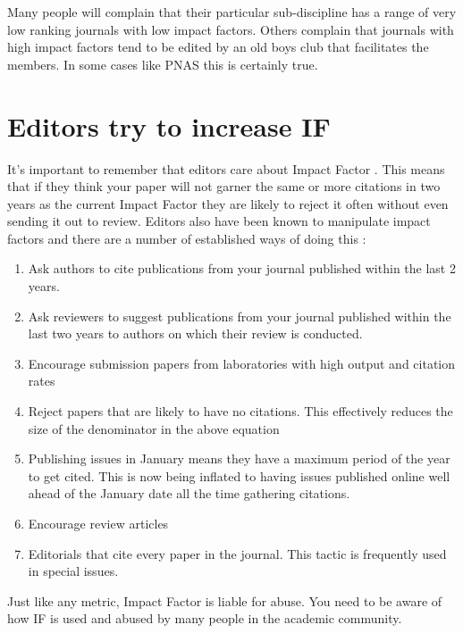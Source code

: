 \documentclass[
]{krantz}
\providecommand{\tightlist}{%
  \setlength{\itemsep}{0pt}\setlength{\parskip}{0pt}}
\begin{document}
Many people will complain that their particular sub-discipline has a range of very low ranking journals with low impact factors. Others complain that journals with high impact factors tend to be edited by an old boys club that facilitates the members. In some cases like PNAS this is certainly true.

\hypertarget{editors-try-to-increase-if}{%
\section{Editors try to increase IF}\label{editors-try-to-increase-if}}

It's important to remember that editors care about Impact Factor \citep[see][]{ioannidis2019user}. This means that if they think your paper will not garner the same or more citations in two years as the current Impact Factor they are likely to reject it often without even sending it out to review. Editors also have been known to manipulate impact factors and there are a number of established ways of doing this \citep[see][]{metze2010bureaucrats, martin2016editors}:

\begin{enumerate}
\def\labelenumi{\arabic{enumi}.}
\tightlist
\item
  Ask authors to cite publications from your journal published within the last 2 years.
\item
  Ask reviewers to suggest publications from your journal published within the last two years to authors on which their review is conducted.
\item
  Encourage submission papers from laboratories with high output and citation rates
\item
  Reject papers that are likely to have no citations. This effectively reduces the size of the denominator in the above equation
\item
  Publishing issues in January means they have a maximum period of the year to get cited. This is now being inflated to having issues published online well ahead of the January date all the time gathering citations.
\item
  Encourage review articles
\item
  Editorials that cite every paper in the journal. This tactic is frequently used in special issues.
\end{enumerate}

Just like any metric, Impact Factor is liable for abuse. You need to be aware of how IF is used and abused by many people in the academic community.
\end{document}
